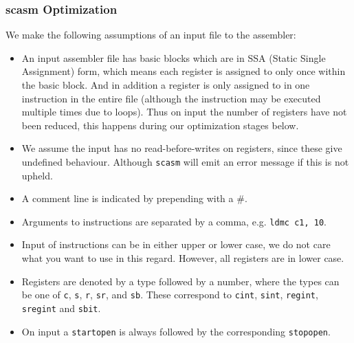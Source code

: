\subsubsection{scasm Optimization}
We make the following assumptions of an input file to the assembler:
\begin{itemize}
\item An input assembler file has basic blocks which are in SSA (Static Single Assignment) form, 
which means each register is assigned to only once within the basic block.
And in addition a register is only assigned to in one instruction in the entire
file (although the instruction may be executed multiple times due to loops).
Thus on input the number of registers have not been reduced, this
happens during our optimization stages below.

\item We assume the input has no read-before-writes on registers, since these give
undefined behaviour. Although \verb+scasm+ will emit an error message if this is not upheld.

\item A comment line is indicated by prepending with a $\#$.

\item Arguments to instructions are separated by a comma, e.g. \verb+ldmc c1, 10+.

\item Input of instructions can be in either upper or lower case, we do not care what you want to use in this
regard. However, all registers are in lower case.

\item Registers are denoted by a type followed by a number, where the types can be
one of \verb+c+, \verb+s+, \verb+r+, \verb+sr+, and \verb+sb+. These
correspond to \verb+cint+, \verb+sint+, \verb+regint+, \verb+sregint+ and
\verb+sbit+.

\item On input a \verb+startopen+ is always followed by the corresponding
\verb+stopopen+.
\end{itemize}

